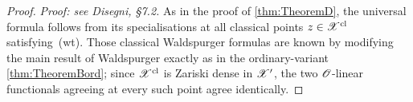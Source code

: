 \begin{proof}
  \textit{Proof: see Disegni, §7.2.}
  As in the proof of \cref{thm:TheoremD}, the universal formula follows
  from its specialisations at all classical points $z \in
  \mathscr{X}^{\mathrm{cl}}$ satisfying~(wt).  Those classical Waldspurger
  formulas are known by modifying the main result of Waldspurger
  \cite{wald} exactly as in the ordinary-variant
  \cref{thm:TheoremBord}; since $\mathscr{X}^{\mathrm{cl}}$ is Zariski dense in
  $\mathscr{X}'$, the two $\mathscr{O}$-linear functionals agreeing at every such point
  agree identically.
\end{proof}
